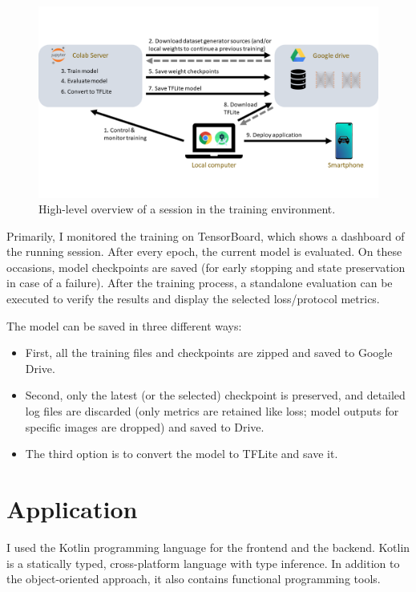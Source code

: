\begin{figure}[htb]
 \centerline{\includegraphics[width=1.0\columnwidth]{.//Figure/Technologies/training_environment.png}}
 \caption{High-level overview of a session in the training environment.}
 \label{fig:training_environment}
\end{figure}

Primarily, I monitored the training on TensorBoard, which shows a dashboard of the running session. After every epoch, the current model is evaluated. On these occasions, model checkpoints are saved (for early stopping and state preservation in case of a failure). After the training process, a standalone evaluation can be executed to verify the results and display the selected loss/protocol metrics.

The model can be saved in three different ways:

\begin{itemize}
  \item First, all the training files and checkpoints are zipped and saved to Google Drive.
  \item Second, only the latest (or the selected) checkpoint is preserved, and detailed log files are discarded (only metrics are retained like loss; model outputs for specific images are dropped) and saved to Drive.
  \item The third option is to convert the model to TFLite and save it.
\end{itemize}

\pagebreak
\section{Application}

I used the Kotlin programming language\cite{Kotlin} for the frontend and the backend. Kotlin is a statically typed, cross-platform language with type inference. In addition to the object-oriented approach, it also contains functional programming tools.


